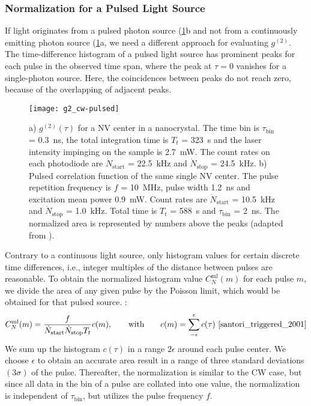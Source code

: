 \subsubsection{Normalization for a Pulsed Light Source}
If light originates from a pulsed photon source (\cref{fig:g2cwpulsed}b and not from a continuously emitting photon source (\cref{fig:g2cwpulsed}a, we need a different approach for evaluating $g^{(2)}$. The time-difference histogram of a pulsed light source has prominent peaks for each pulse in the observed time span, where the peak at $\tau=0$ vanishes for a single-photon source. Here, the coincidences between peaks do not reach zero, because of the overlapping of adjacent peaks.
\begin{figure}[h!]
	\centering
	\texttt{[image: g2\_cw-pulsed]}
	\caption{a) $g^{(2)}(\tau)$ for a \ac{NV} center in a nanocrystal. The time bin is $\tau_\mathrm{bin}$ = \SI{0.3}{\ns}, the total integration time is $T_t$ = \SI{323}{\s} and the laser intensity impinging on the sample is \SI{2.7}{\mW}. The count rates on each photodiode are $\dot{N}_\mathrm{start}$ = \SI{22.5}{\kHz} and $\dot{N}_\mathrm{stop}$ = \SI{24.5}{\kHz}. b) Pulsed correlation function of the same single NV center. The pulse repetition frequency is $f$ = \SI{10}{\MHz}, pulse width \SI{1.2}{\ns} and excitation mean power \SI{0.9}{\mW}. Count rates are $\dot{N}_\mathrm{start}$ = \SI{10.5}{\kHz} and $\dot{N}_\mathrm{stop}$ = \SI{1.0}{\kHz}. Total time is $T_t$ = \SI{588}{\s} and $\tau_\mathrm{bin}$ = \SI{2}{\ns}. The normalized area is represented by numbers above the peaks (adapted from \cite{beveratos_room_2002}).}
	\label{fig:g2cwpulsed}
\end{figure}
\noindent Contrary to a continuous light source, only histogram values for certain discrete time differences, i.e., integer multiples of the distance between pulses are reasonable. To obtain the normalized histogram value $C^\mathrm{ml}_N(m)$ for each pulse $m$, we divide the area of any given pulse by the Poisson limit, which would be obtained for that pulsed source. \cite{beveratos_room_2002}:
\begin{equation}\label{eq:mlNormg2}
	C^\mathrm{ml}_N(m)=\dfrac{f}{\dot{N}_\mathrm{start}\dot{N}_\mathrm{stop}T_t}c(m),\qquad \textrm{with}\qquad c(m)=\sum_{-\epsilon}^{\epsilon}c(\tau)\textrm{ \cite{santori_triggered_2001}}
\end{equation}
We sum up the histogram $c(\tau)$ in a range $2\epsilon$ around each pulse center. We choose $\epsilon$ to obtain an accurate area result in a range of three standard deviations $(3\sigma)$ of the pulse. Thereafter, the normalization is similar to the \ac{CW} case, but since all data in the bin of a pulse are collated into one value, the normalization is independent of $\tau_\mathrm{bin}$, but utilizes the pulse frequency $f$.

